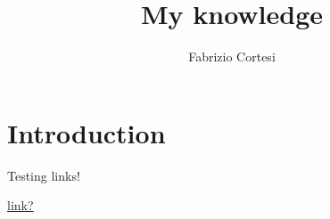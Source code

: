 \documentclass{article}
\title{My knowledge}
\author{Fabrizio Cortesi}
\begin{document}
\maketitle

\section*{Introduction}

Testing links!

\href{run:./link.pdf}{link?}
\end{document}
